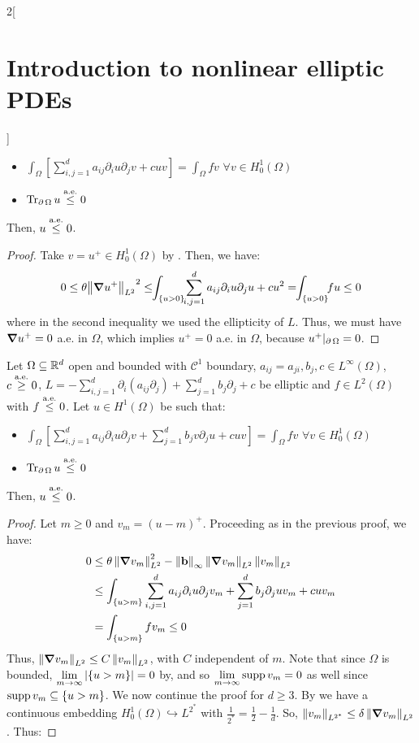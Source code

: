 \documentclass[../../../main_math.tex]{subfiles}
\begin{document}
\begin{multicols}{2}[\section{Introduction to nonlinear elliptic PDEs}]
\begin{theorem}
    \begin{itemize}
      \item $\displaystyle \int_\Omega\left[\sum_{i,j=1}^da_{ij}\partial_iu\partial_jv+cuv\right]=\int_\Omega fv$ $\forall v\in H^1_0(\Omega)$
      \item $\Tr_{\operatorname{\partial}{\Omega}}u\overset{\text{a.e.}}{\leq}0$
    \end{itemize}
    Then, $u\overset{\text{a.e.}}{\leq}0$.
  \end{theorem}
  \begin{proof}
    Take $v=u^+\in H^1_0(\Omega)$ by . Then, we have:
    $$
      0\leq \theta {\norm{\grad u^+}_{L^2}}^2\leq\!\! \int_{\{u>0\}}\!\!\sum_{i,j=1}^d a_{ij}\partial_iu\partial_ju+cu^2=\!\!\int_{\{u>0\}} \!\!fu\leq 0
    $$
    where in the second inequality we used the ellipticity of $L$. Thus, we must have $\grad u^+=0$ a.e. in $\Omega$, which implies $u^+=0$ a.e. in $\Omega$, because $u^+|_{\operatorname{\partial}{\Omega}}=0$.
  \end{proof}
  \begin{theorem}\label{INEPDE:weak_max_principle}
    Let $\Omega\subseteq\mathbb{R}^d$ open and bounded with $\mathcal{C}^1$ boundary, $a_{ij}=a_{ji},b_j,c\in L^\infty(\Omega)$, $c \overset{\text{a.e.}}{\geq}0$, $L=-\sum_{i,j=1}^d\partial_i(a_{ij}\partial_j)+\sum_{j=1}^db_j\partial_j+c$ be elliptic and $f\in L^2(\Omega)$ with $f\overset{\text{a.e.}}{\leq} 0$. Let $u\in H^1(\Omega)$ be such that:
    \begin{itemize}
      \item $\displaystyle \int_\Omega\left[\sum_{i,j=1}^da_{ij}\partial_iu\partial_jv+ \sum_{j=1}^db_jv\partial_ju+cuv\right]=\int_\Omega fv$ $\forall v\in H^1_0(\Omega)$
      \item $\Tr_{\operatorname{\partial}{\Omega}}u\overset{\text{a.e.}}{\leq}0$
    \end{itemize}
    Then, $u\overset{\text{a.e.}}{\leq}0$.
  \end{theorem}
  \begin{proof}
    Let $m\geq 0$ and $v_m={(u-m)}^+$. Proceeding as in the previous proof, we have:
    \begin{align*}
      0 & \leq \theta \left\|\grad v_m\right\|_{L^2}^2-\left\|\boldsymbol{\mathrm{b}}\right\|_\infty\left\|\grad v_m\right\|_{L^2}\left\|v_m\right\|_{L^2}        \\
        & \leq \int_{\{u>m\}}\sum_{i,j=1}^d a_{ij}\partial_iu\partial_jv_m+\sum_{j=1}^db_j\partial_ju v_m+cu v_m \\
        & =\int_{\{u>m\}}fv_m\leq 0
    \end{align*}
    Thus, $\left\|\grad v_m\right\|_{L^2}\leq C \left\|v_m\right\|_{L^2}$, with $C$ independent of $m$. Note that since $\Omega$ is bounded, $\displaystyle\lim_{m\to\infty}\abs{\{u>m\}}=0$ by, and so $\displaystyle\lim_{m\to\infty}\operatorname{supp} v_m=0$ as well since $\operatorname{supp} v_m\subseteq \{u>m\}$. We now continue the proof for $d\geq 3$. By  we have a continuous embedding $H_0^1(\Omega)\hookrightarrow L^{2^*}$ with $\frac{1}{2^*}=\frac{1}{2}-\frac{1}{d}$. So, $\left\|v_m\right\|_{L^{2^*}}\leq \delta \left\|\grad v_m\right\|_{L^2}$. Thus:

\end{proof}
\end{multicols}
\end{document}
